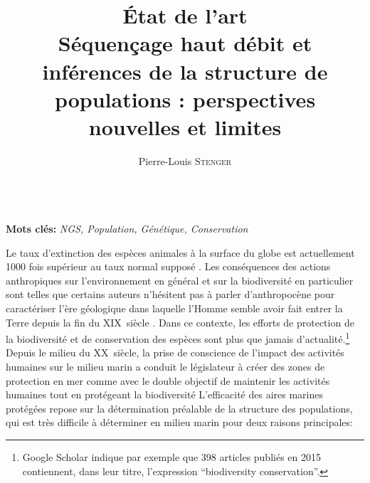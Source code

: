 \documentclass[a4paper,12pt,twoside]{article}\usepackage[]{graphicx}\usepackage[]{color}
\begin{document}
\newpage

\title{{\Huge État de l'art}\\[3pc]Séquençage haut débit et inférences de la structure de populations : perspectives nouvelles et limites}
\author{Pierre-Louis \textsc{Stenger}}
\date{}
\frontmatter

\maketitle 






~~\\
\textbf{Mots clés:} \emph{NGS, Population, Génétique, Conservation}
~~\\

\newpage


\mainmatter


 \setcounter{page}{1} 


Le taux d'extinction des espèces animales à la surface du globe est actuellement 1000 fois supérieur au taux normal supposé \citep{pimm2014aa}. Les conséquences des actions anthropiques sur l'environnement en général et sur la biodiversité en particulier sont telles que certains auteurs n'hésitent pas à parler d'anthropocène pour caractériser l'ère géologique dans laquelle l'Homme semble avoir fait entrer la Terre depuis la fin du XIX\ieme{}~siècle \citep{crutzen23ff}. Dans ce contexte, les efforts de protection de la biodiversité et de conservation des espèces sont plus que jamais d'actualité.\footnote{Google Scholar indique par exemple que 398 articles publiés en 2015 contiennent, dans leur titre, l'expression ``biodiversity conservation''.} Depuis le milieu du XX\ieme{}~siècle, la prise de conscience de l'impact des activités humaines sur le milieu marin a conduit le législateur à créer des zones de protection en mer comme avec le double objectif de maintenir les activités humaines tout en protégeant la biodiversité \citep{frost2016} L'efficacité des aires marines protégées repose sur la détermination préalable de la structure des populations, qui est très difficile à déterminer en milieu marin \citep{Jonsson2016} pour deux raisons principales:
\end{document}
